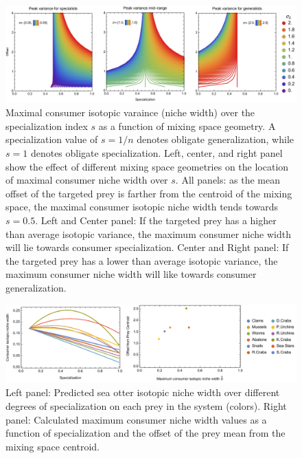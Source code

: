 \documentclass{frontiersSCNS}
\begin{document}
\begin{figure}[h!]
\centering
\includegraphics[width=1\textwidth]{fig_specvar.pdf}
\caption{
Maximal consumer isotopic varaince (niche width) over the specialization index $s$ as a function of mixing space geometry. A specialization value of $s=1/n$ denotes obligate generalization, while $s=1$ denotes obligate specialization.
Left, center, and right panel show the effect of different mixing space geometries on the location of maximal consumer niche width over $s$.
All panels: as the mean offset of the targeted prey is farther from the centroid of the mixing space, the maximal consumer isotopic niche width tends towards $s=0.5$.
Left and Center panel: If the targeted prey has a higher than average isotopic variance, the maximum consumer niche width will lie towards consumer specialization.
Center and Right panel: If the targeted prey has a lower than average isotopic variance, the maximum consumer niche width will like towards consumer generalization.
}
  \label{figspecvar}
\end{figure}



\begin{figure}[h!]
\centering
\includegraphics[width=1\textwidth]{fig_ottervar.pdf}
\caption{
Left panel: Predicted sea otter isotopic niche width over different degrees of specialization on each prey in the system (colors).
Right panel: Calculated maximum consumer niche width values as a function of specialization and the offset of the prey mean from the mixing space centroid.
}
  \label{figottervar}
\end{figure}
\end{document}
